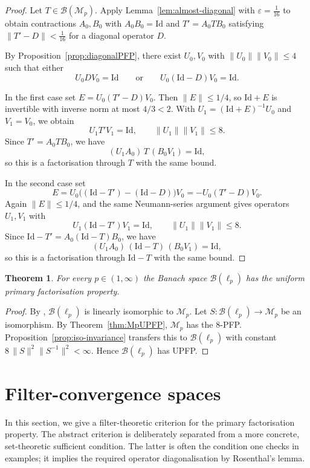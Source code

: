 \documentclass[11pt]{amsart}
\theoremstyle{plain}
\newtheorem{theorem}{Theorem}[section]
\theoremstyle{definition}
\numberwithin{equation}{section}
\newcommand{\norm}[1]{\lVert #1 \rVert}
\newcommand{\Bop}{\mathcal{B}}
\newcommand{\Id}{\mathrm{Id}}
\renewcommand{\le}{\leqslant}
\begin{document}
\begin{proof}
Let $T\in\Bop(\mathcal{M}_p)$.
Apply Lemma~\ref{lem:almost-diagonal} with $\varepsilon=\tfrac{1}{16}$ to obtain
contractions $A_0,B_0$ with $A_0B_0=\Id$ and $T'=A_0TB_0$ satisfying $\norm{T'-D}<\tfrac{1}{16}$
for a diagonal operator $D$.

By Proposition~\ref{prop:diagonalPFP}, there exist $U_0,V_0$ with $\|U_0\|\|V_0\|\le4$ such that either
\[
    U_0DV_0=\Id
    \qquad\text{or}\qquad
    U_0(\Id-D)V_0=\Id.
\]

In the first case set $E=U_0(T'-D)V_0$. Then $\|E\|\le1/4$, so $\Id+E$ is invertible with inverse norm at most $4/3<2$. With
$U_1=(\Id+E)^{-1}U_0$ and $V_1=V_0$, we obtain
\[
    U_1T'V_1=\Id,
    \qquad
    \|U_1\|\|V_1\|\le8.
\]
Since $T'=A_0TB_0$, we have
\[
    (U_1A_0)\,T\,(B_0V_1)=\Id,
\]
so this is a factorisation through $T$ with the same bound.

In the second case set
\[
    E=U_0\bigl((\Id-T')-(\Id-D)\bigr)V_0=-U_0(T'-D)V_0.
\]
Again $\|E\|\le1/4$, and the same Neumann-series argument gives operators $U_1,V_1$ with
\[
    U_1(\Id-T')V_1=\Id,
    \qquad
    \|U_1\|\|V_1\|\le8.
\]
Since $\Id-T'=A_0(\Id-T)B_0$, we have
\[
    (U_1A_0)\,(\Id-T)\,(B_0V_1)=\Id,
\]
so this is a factorisation through $\Id-T$ with the same bound.
\end{proof}

\begin{theorem}\label{thm:BlpUPFP}
    For every $p\in(1,\infty)$ the Banach space $\Bop(\ell_p)$ has the uniform primary factorisation property.
\end{theorem}

\begin{proof}
    By \cite[Section~2]{AriasFarmer}, $\Bop(\ell_p)$ is linearly isomorphic to $\mathcal{M}_p$.
    Let $S\colon \Bop(\ell_p)\to \mathcal{M}_p$ be an isomorphism.
    By Theorem~\ref{thm:MpUPFP}, $\mathcal{M}_p$ has the $8$-PFP.
    Proposition~\ref{prop:iso-invariance} transfers this to $\Bop(\ell_p)$ with constant
    $8\,\norm{S}^2\norm{S^{-1}}^2<\infty$.
    Hence $\Bop(\ell_p)$ has UPFP.
\end{proof}

\section{Filter-convergence spaces}\label{sec:primary-filters}

In this section, we give a filter-theoretic criterion for the primary factorisation property.  The abstract criterion is deliberately separated from a more concrete, set-theoretic sufficient condition. The latter is often the condition one checks in examples; it implies the required operator diagonalisation by Rosenthal's lemma.
\end{document}
